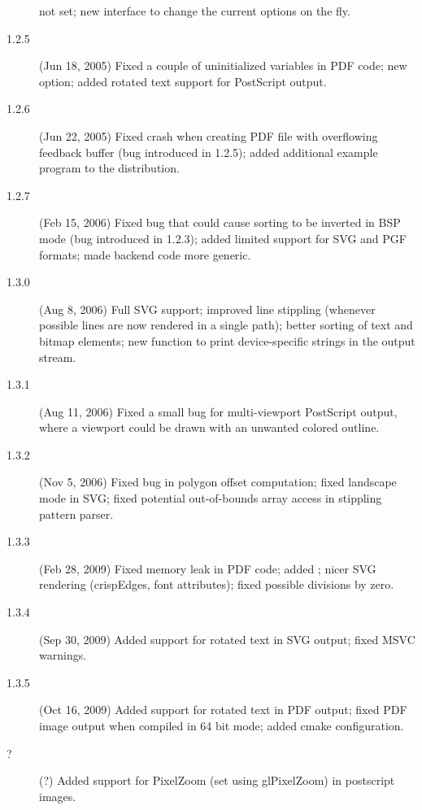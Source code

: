 \begin{description}
  not set; new  interface to change the current
  options on the fly.
\item[1.2.5] (Jun 18, 2005) Fixed a couple of uninitialized variables in
  PDF code; new  option; added rotated
  text support for PostScript output.
\item[1.2.6] (Jun 22, 2005) Fixed crash when creating PDF file with
  overflowing feedback buffer (bug introduced in 1.2.5); added
  additional example program  to the
  distribution.
\item[1.2.7] (Feb 15, 2006) Fixed bug that could cause sorting to be
  inverted in BSP mode (bug introduced in 1.2.3); added limited
  support for SVG and PGF formats; made backend code more generic.
\item[1.3.0] (Aug 8, 2006) Full SVG support; improved line stippling
  (whenever possible lines are now rendered in a single path); better
  sorting of text and bitmap elements; new function 
  to print device-specific strings in the output stream.
\item[1.3.1] (Aug 11, 2006) Fixed a small bug for multi-viewport
  PostScript output, where a viewport could be drawn with an unwanted
  colored outline.
\item[1.3.2] (Nov 5, 2006) Fixed bug in polygon offset computation;
  fixed landscape mode in SVG; fixed potential out-of-bounds array
  access in stippling pattern parser.
\item[1.3.3] (Feb 28, 2009) Fixed memory leak in PDF code; added
  ; nicer SVG rendering (crispEdges, font attributes);
  fixed possible divisions by zero.
\item[1.3.4] (Sep 30, 2009) Added support for rotated text in SVG output;
  fixed MSVC warnings.
\item[1.3.5] (Oct 16, 2009) Added support for rotated text in PDF output;
  fixed PDF image output when compiled in 64 bit mode; added cmake
  configuration.
\item[?] (?) Added support for PixelZoom (set using glPixelZoom) in
  postscript images.
\end{description}



